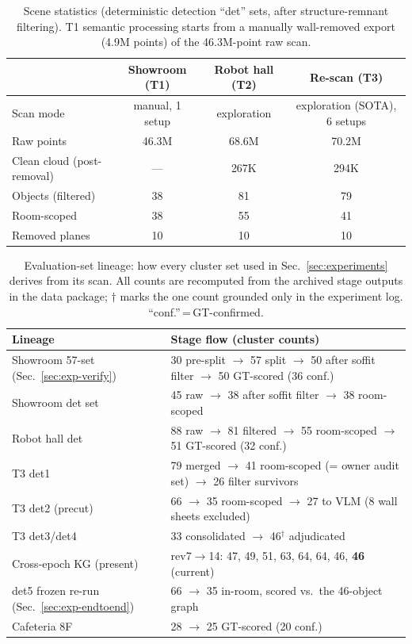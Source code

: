 \begin{table}[t]
\centering
\caption{Scene statistics (deterministic detection ``det'' sets, after
structure-remnant filtering).
T1 semantic processing starts from a manually wall-removed export (4.9M
points) of the 46.3M-point raw scan.}
\label{tab:scenes}
\small
\begin{tabular}{@{}lccc@{}}
\toprule
 & Showroom (T1) & Robot hall (T2) & Re-scan (T3) \\
\midrule
Scan mode & manual, 1 setup & exploration & exploration (SOTA), 6 setups \\
Raw points & 46.3M & 68.6M & 70.2M \\
Clean cloud (post-removal) & --- & 267K & 294K \\
Objects (filtered) & 38 & 81 & 79 \\
Room-scoped & 38 & 55 & 41 \\
Removed planes & 10 & 10 & 10 \\
\bottomrule
\end{tabular}
\end{table}

\begin{table}[t]
\centering
\caption{Evaluation-set lineage: how every cluster set used in
Sec.~\ref{sec:experiments} derives from its scan. All counts are
recomputed from the archived stage outputs in the data package;
$\dagger$ marks the one count grounded only in the experiment log.
``conf.''\,=\,GT-confirmed.}
\label{tab:sampleflow}
\footnotesize
\setlength{\tabcolsep}{3.5pt}
\begin{tabular}{@{}ll@{}}
\toprule
Lineage & Stage flow (cluster counts) \\
\midrule
Showroom 57-set (Sec.~\ref{sec:exp-verify}) & 30 pre-split
$\rightarrow$ 57 split $\rightarrow$ 50 after soffit filter
$\rightarrow$ 50 GT-scored (36 conf.) \\
Showroom det set & 45 raw $\rightarrow$ 38 after soffit filter
$\rightarrow$ 38 room-scoped \\
Robot hall det & 88 raw $\rightarrow$ 81 filtered $\rightarrow$ 55
room-scoped $\rightarrow$ 51 GT-scored (32 conf.) \\
T3 det1 & 79 merged $\rightarrow$ 41 room-scoped (= owner audit set)
$\rightarrow$ 26 filter survivors \\
T3 det2 (precut) & 66 $\rightarrow$ 35 room-scoped $\rightarrow$ 27 to
VLM (8 wall sheets excluded) \\
T3 det3/det4 & 33 consolidated $\rightarrow$ 46$^{\dagger}$ adjudicated \\
Cross-epoch KG (present) & rev7$\rightarrow$14:
47, 49, 51, 63, 64, 64, 46, \textbf{46} (current) \\
det5 frozen re-run (Sec.~\ref{sec:exp-endtoend}) & 66 $\rightarrow$ 35
in-room, scored vs.\ the 46-object graph \\
Cafeteria 8F & 28 $\rightarrow$ 25 GT-scored (20 conf.) \\
\bottomrule
\end{tabular}
\end{table}

